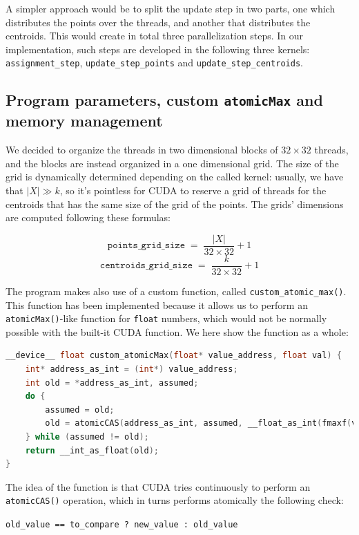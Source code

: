 \documentclass[11pt, journal]{IEEEtran}
\newcommand{\nwl}{

\vspace{11pt}

}
\begin{document}
A simpler approach would be to split the update step in two parts, one which distributes the points over the threads, and another that distributes the centroids. This would create in total three parallelization steps. In our implementation, such steps are developed in the following three kernels: \verb|assignment_step|, \verb|update_step_points| and \verb|update_step_centroids|.

\subsection{Program parameters, custom \texttt{atomicMax} and memory management}

We decided to organize the threads in two dimensional blocks of $32 \times 32$ threads, and the blocks are instead organized in a one dimensional grid. The size of the grid is dynamically determined depending on the called kernel: usually, we have that $|X| \gg k$, so it's pointless for CUDA to reserve a grid of threads for the centroids that has the same size of the grid of the points. The grids' dimensions are computed following these formulas:

\[ \texttt{points\_grid\_size} \; = \; \frac{\left| X \right|}{32 \times 32} + 1 \]
\[ \texttt{centroids\_grid\_size} \; = \; \frac{k}{32 \times 32} + 1 \]

The program makes also use of a custom function, called \verb|custom_atomic_max()|. This function has been implemented because it allows us to perform an \verb|atomicMax()|-like function for \verb|float| numbers, which would not be normally possible with the built-it CUDA function. We here show the function as a whole:
\nwl
\begin{lstlisting}[language = C]
__device__ float custom_atomicMax(float* value_address, float val) {
    int* address_as_int = (int*) value_address;
    int old = *address_as_int, assumed;
    do {
        assumed = old;
        old = atomicCAS(address_as_int, assumed, __float_as_int(fmaxf(val, __int_as_float(assumed))));
    } while (assumed != old);
    return __int_as_float(old);
}\end{lstlisting}
\nwl
The idea of the function is that CUDA tries continuously to perform an \verb|atomicCAS()| operation, which in turns performs atomically the following check:
\begin{center}
    \scriptsize
    \verb|old_value == to_compare ? new_value : old_value|
\end{center}
\end{document}
